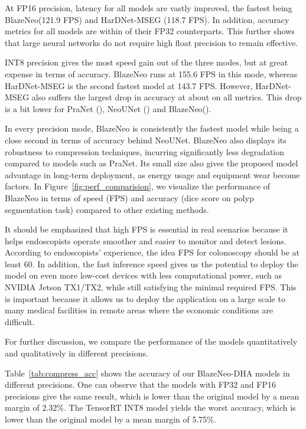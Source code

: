 \documentclass{ieeeaccess}
\newcommand{\ModelName}{BlazeNeo\xspace}
\newcommand{\DHA}{BlazeNeo-DHA\xspace}
\begin{document}
At FP16 precision, latency for all models are vastly improved, the fastest being \ModelName (121.9 FPS) and HarDNet-MSEG (118.7 FPS). In addition, accuracy metrics for all models are within  of their FP32 counterparts. This further shows that large neural networks do not require high float precision to remain effective.

INT8 precision gives the most speed gain out of the three modes, but at great expense in terms of accuracy. \ModelName runs at 155.6 FPS in this mode, whereas HarDNet-MSEG is the second fastest model at 143.7 FPS. However, HarDNet-MSEG also suffers the largest drop in accuracy at about  on all metrics. This drop is a bit lower for PraNet (), NeoUNet () and \ModelName ().

In every precision mode, \ModelName is consistently the fastest model while being a close second in terms of accuracy behind NeoUNet. \ModelName also displays its robustness to compression techniques, incurring significantly less degradation compared to models such as PraNet. Its small size also gives the proposed model advantage in long-term deployment, as energy usage and equipment wear become factors. In Figure~\ref{fig:perf_comparision}, we visualize the performance of BlazeNeo in terms of speed (FPS) and accuracy (dice score on polyp segmentation task) compared to other existing methods.

It should be emphasized that high FPS is essential in real scenarios because it helps endoscopists operate smoother and easier to monitor and detect lesions. According to endoscopists' experience, the idea FPS for colonoscopy should be at least 60. In addition, the fast inference speed gives us the potential to deploy the model on even more low-cost devices with less computational power, such as NVIDIA Jetson TX1/TX2, while still satisfying the minimal required FPS. This is important because it allows us to deploy the application on a large scale to many medical facilities in remote areas where the economic conditions are difficult.





For further discussion, we compare the performance of the models quantitatively and qualitatively in different precisions.


Table~\ref{tab:compress_acc} shows the accuracy of our \DHA models in different precisions. One can observe that the models with FP32 and FP16 precisions give the same result, which is lower than the original model by a mean margin of 2.32\%. The TensorRT INT8 model yields the worst accuracy, which is lower than the original model by a mean margin of 5.75\%.
\end{document}
